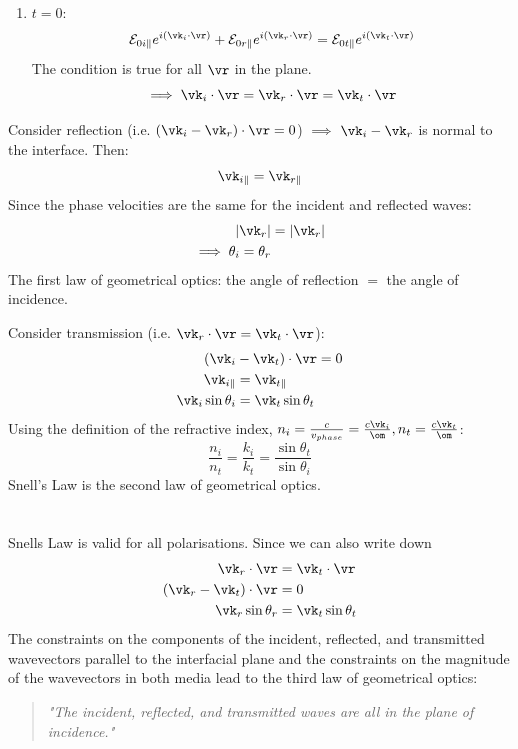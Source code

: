\documentclass[a4paper, 11pt, normalem]{report}
\renewcommand\E{\mathcal{E}}
\begin{document}
\begin{enumerate}
	\item $t=0$:
	\begin{equation}
		\E_{0i\parallel}e^{i(\vk_i\cdot\vr)} + \E_{0r\parallel}e^{i(\vk_r\cdot\vr)} = \E_{0t\parallel}e^{i(\vk_t\cdot\vr)}
	\end{equation}
	The condition is true for all $\vr$ in the plane.
	\begin{equation}
		\implies \vk_i\cdot\vr = \vk_r\cdot\vr = \vk_t\cdot\vr
	\end{equation}
\end{enumerate}
Consider reflection (i.e. $(\vk_i - \vk_r)\cdot\vr = 0$) $\implies$ $\vk_i - \vk_r$ is normal to the interface. Then:
\begin{equation}
	\vk_{i\parallel} = \vk_{r\parallel}
\end{equation}
Since the phase velocities are the same for the incident and reflected waves:
\begin{align}
	|\vk_r| &= |\vk_r| \\
	\implies \theta_i = \theta_r
\end{align}
The first law of geometrical optics: the angle of reflection $=$ the angle of incidence.

Consider transmission (i.e. $\vk_r\cdot\vr = \vk_t\cdot\vr$):
\begin{align}
	(\vk_i &- \vk_t)\cdot\vr = 0 \\
	\vk_{i\parallel} &= \vk_{t\parallel} \\
	\vk_i\sin\theta_i &= \vk_t\sin\theta_t
\end{align}
Using the definition of the refractive index, $n_i = \frac{c}{v_{phase}} = \frac{c\vk_i}{\om}, n_t = \frac{c\vk_t}{\om}$:
\begin{equation}
	\frac{n_i}{n_t} = \frac{k_i}{k_t} = \frac{\sin\theta_t}{\sin\theta_i} \tag{Snell's Law}
\end{equation}
Snell's Law is the second law of geometrical optics.

\chapter{}
Snells Law is valid for all polarisations.
Since we can also write down
\begin{align}
	\vk_r\cdot \vr &= \vk_t\cdot \vr \\
	(\vk_r - \vk_t)\cdot\vr &= 0 \\
	\vk_r\sin\theta_r &= \vk_t\sin\theta_t
\end{align}
The constraints on the components of the incident, reflected, and transmitted wavevectors parallel to the interfacial plane and the constraints on the magnitude of the wavevectors in both media lead to the third law of geometrical optics:
\begin{quote}
\emph{"The incident, reflected, and transmitted waves are all in the plane of incidence."}
\end{quote}
\end{document}
